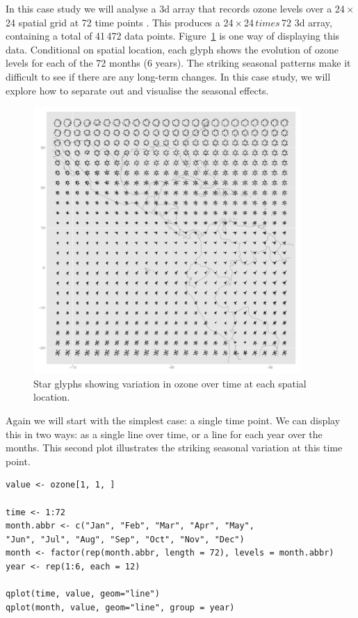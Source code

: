 \documentclass[letterpage]{scrartcl}
\begin{document}
In this case study we will analyse a 3d array that records ozone levels over a 24\,$\times$\,24 spatial grid at 72 time points \citep{hobbs:2007}.  This produces a 24\,$\times$\,24\,$times$\,72 3d array, containing a total of 41\,472 data points.  Figure~\ref{fig:ozone-glyph} is one way of displaying this data.  Conditional on spatial location, each glyph shows the evolution of ozone levels for each of the 72 months (6 years).  The striking seasonal patterns make it difficult to see if there are any long-term changes.  In this case study, we will explore how to separate out and visualise the seasonal effects.

\begin{figure}[htbp]
  \centering
    \includegraphics[width=4in]{ozone-glyph}
  \caption{Star glyphs showing variation in ozone over time at each spatial location.}
  \label{fig:ozone-glyph}
\end{figure}


Again we will start with the simplest case: a single time point.  We can display this in two ways: as a single line over time, or a line for each year over the months.  This second plot illustrates the striking seasonal variation at this time point.

\begin{verbatim}
value <- ozone[1, 1, ]

time <- 1:72
month.abbr <- c("Jan", "Feb", "Mar", "Apr", "May", 
"Jun", "Jul", "Aug", "Sep", "Oct", "Nov", "Dec")
month <- factor(rep(month.abbr, length = 72), levels = month.abbr)
year <- rep(1:6, each = 12)

qplot(time, value, geom="line")
qplot(month, value, geom="line", group = year)
\end{verbatim}
\end{document}
